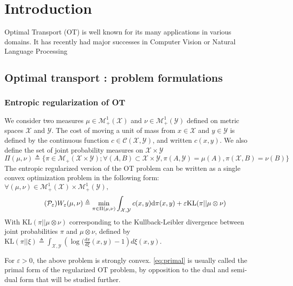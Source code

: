 \section{Introduction}
Optimal Transport (OT) is well known for its many applications in various domains. It has recently had major successes in Computer Vision or Natural Language Processing 

\subsection{Optimal transport : problem formulations}
 \cite{monge1781}
\subsubsection{Entropic regularization of OT}
We consider two measures $\mu \in \mathcal{M}_+^1(\mathcal{X})$ and $\nu \in \mathcal{M}_+^1(\mathcal{Y})$ defined on metric spaces $\mathcal{X}$ and $\mathcal{Y}$. The cost of moving a unit of mass from $x\in \mathcal{X}$ and  $y\in \mathcal{Y}$ is defined by the continuous function $c \in \mathcal{C}(\mathcal{X}, \mathcal{Y})$, and written $c(x, y)$.
We also define the set of joint probability measures on $\mathcal{X}\times\mathcal{Y}$
\[
\Pi(\mu, \nu) \triangleq \{\pi \in \mathcal{M}_+(\mathcal{X}\times \mathcal{Y}) ; \forall (A, B) \subset \mathcal{X}\times \mathcal{Y}, \pi(A, \mathcal{Y}) = \mu(A), \pi(\mathcal{X}, B) = \nu(B)\}
\]
The entropic regularized version of the OT problem \cite{cuturi_sinkhorn_2013} can be written as a single convex optimization problem in the following form: $\forall (\mu, \nu)  \in \mathcal{M}_+^1(\mathcal{X})\times\mathcal{M}_+^1(\mathcal{Y}),$
\[\tag{$\mathcal{P}_\varepsilon$}
\label{eq:primal}
W_\varepsilon(\mu, \nu) \triangleq \min_{\pi\in \Pi(\mu, \nu)} \int_{\mathcal{X}, \mathcal{Y}} c(x, y)\text{d} \pi(x, y) + \varepsilon\text{KL}(\pi|| \mu \otimes \nu)
\]
With $\text{KL}(\pi|| \mu \otimes \nu)$ corresponding to the Kullback-Leibler divergence between joint probabilities $\pi$ and  $\mu \otimes \nu$, defined by $\text{KL}(\pi|| \xi) \triangleq  \int_{\mathcal{X}, \mathcal{Y}} \left(\log(\frac{d\pi}{d\xi}(x, y) - 1\right)d\xi(x, y)$.

For $\varepsilon > 0$, the above problem is strongly convex. \eqref{eq:primal} is usually called the primal form of the regularized OT problem, by opposition to the dual and semi-dual form that will be studied further.


